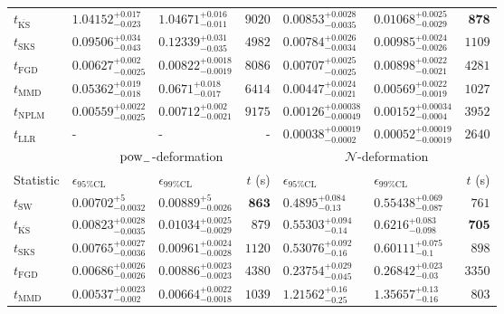 \begin{tabular}{l|llr|llr}
	$t_{\overline{\mathrm{KS}}}$ & $1.04152_{-0.023}^{+0.017}$ & $1.04671_{-0.011}^{+0.016}$ & $9020$ & $0.00853_{-0.0035}^{+0.0028}$ & $0.01068_{-0.0029}^{+0.0025}$ & ${\mathbf{878}}$ \\
	$t_{\mathrm{SKS}}$ & $0.09506_{-0.043}^{+0.034}$ & $0.12339_{-0.035}^{+0.031}$ & $4982$ & $0.00784_{-0.0034}^{+0.0026}$ & $0.00985_{-0.0026}^{+0.0024}$ & $1109$ \\
	$t_{\mathrm{FGD}}$ & ${\mathbf{0.00627_{-0.0025}^{+0.002}}}$ & ${\mathbf{0.00822_{-0.0019}^{+0.0018}}}$ & $8086$ & $0.00707_{-0.0025}^{+0.0025}$ & $0.00898_{-0.0021}^{+0.0022}$ & $4281$ \\
	$t_{\mathrm{MMD}}$ & $0.05362_{-0.018}^{+0.019}$ & $0.0671_{-0.017}^{+0.018}$ & $6414$ & ${\mathbf{0.00447_{-0.0021}^{+0.0024}}}$ & ${\mathbf{0.00569_{-0.0019}^{+0.0022}}}$ & $1027$ \\
\rowcolor{red!35}	$t_{\mathrm{NPLM}}$ & $0.00559_{-0.0025}^{+0.0022}$ & $0.00712_{-0.0021}^{+0.002}$ & $9175$ & $0.00126_{-0.00049}^{+0.00038}$ & $0.00152_{-0.0004}^{+0.00034}$ & $3952$ \\
	$t_{\mathrm{LLR}}$ & - & - & - & $0.00038_{-0.0002}^{+0.00019}$ & $0.00052_{-0.00019}^{+0.00019}$ & $2640$ \\
	\toprule
	\multicolumn{1}{c}{} & \multicolumn{3}{c}{$\rm{pow}_{-}$-deformation} & \multicolumn{3}{c}{$\mathcal{N}$-deformation} \\
	Statistic & $\epsilon_{95\%\mathrm{CL}}$ & $\epsilon_{99\%\mathrm{CL}}$ & $t$ (s) & $\epsilon_{95\%\mathrm{CL}}$ & $\epsilon_{99\%\mathrm{CL}}$ & $t$ (s) \\
	\midrule
	$t_{\mathrm{SW}}$ & $0.00702_{-0.0032}^{+5}$ & $0.00889_{-0.0026}^{+5}$ & ${\mathbf{863}}$ & $0.4895_{-0.13}^{+0.084}$ & $0.55438_{-0.087}^{+0.069}$ & $761$ \\
	$t_{\overline{\mathrm{KS}}}$ & $0.00823_{-0.0035}^{+0.0028}$ & $0.01034_{-0.0029}^{+0.0025}$ & $879$ & $0.55303_{-0.14}^{+0.094}$ & $0.6216_{-0.098}^{+0.083}$ & ${\mathbf{705}}$ \\
	$t_{\mathrm{SKS}}$ & $0.00765_{-0.0036}^{+0.0027}$ & $0.00961_{-0.0028}^{+0.0024}$ & $1120$ & $0.53076_{-0.16}^{+0.092}$ & $0.60111_{-0.1}^{+0.075}$ & $898$ \\
	$t_{\mathrm{FGD}}$ & $0.00686_{-0.0026}^{+0.0026}$ & $0.00886_{-0.0023}^{+0.0023}$ & $4380$ & ${\mathbf{0.23754_{-0.045}^{+0.029}}}$ & ${\mathbf{0.26842_{-0.03}^{+0.023}}}$ & $3350$ \\
	$t_{\mathrm{MMD}}$ & ${\mathbf{0.00537_{-0.002}^{+0.0023}}}$ & ${\mathbf{0.00664_{-0.0018}^{+0.0022}}}$ & $1039$ & $1.21562_{-0.25}^{+0.16}$ & $1.35657_{-0.16}^{+0.13}$ & $803$ \\

\end{tabular}
